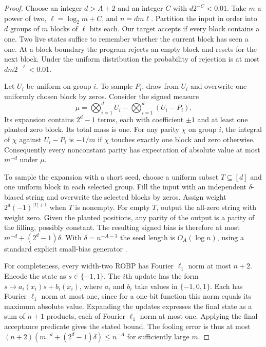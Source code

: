 \documentclass[11pt]{article}
\begin{document}
\begin{proof}
Choose an integer $d>A+2$ and an integer $C$ with $d2^{-C}<0.01$. Take $m$
a power of two, $\ell=\log_2 m+C$, and $n=dm\ell$. Partition the input
in order into $d$ groups of $m$ blocks of $\ell$ bits each. Our target
accepts if every block contains a one. Two live states suffice to remember
whether the current block has seen a one. At a block boundary the program
rejects an empty block and resets for the next block. Under the uniform
distribution the probability of rejection is at most $dm2^{-\ell}<0.01$.

Let $U_i$ be uniform on group $i$. To sample $P_i$, draw from $U_i$ and
overwrite one uniformly chosen block by zeros. Consider the signed measure
\[
  \mu=\bigotimes_{i=1}^d U_i-\bigotimes_{i=1}^d(U_i-P_i).
\]
Its expansion contains $2^d-1$ terms, each with coefficient $\pm1$ and
at least one planted zero block. Its total mass is one. For any parity
$\chi$ on group $i$, the integral of $\chi$ against $U_i-P_i$ is $-1/m$
if $\chi$ touches exactly one block and zero otherwise. Consequently every
nonconstant parity has expectation of absolute value at most $m^{-d}$
under $\mu$.

To sample the expansion with a short seed, choose a uniform subset
$T\subseteq[d]$ and one uniform block in each selected group. Fill the
input with an independent $\delta$-biased string and overwrite the selected
blocks by zeros. Assign weight $2^d(-1)^{|T|+1}$ when $T$ is nonempty.
For empty $T$, output the all-zero string with weight zero. Given the
planted positions, any parity of the output is a parity of the filling,
possibly constant. The resulting signed bias is therefore at most
$m^{-d}+(2^d-1)\delta$. With $\delta=n^{-A-3}$ the seed length is
$O_A(\log n)$, using a standard explicit small-bias generator \cite{AGHP}.

For completeness, every width-two ROBP has Fourier $\ell_1$ norm at most
$n+2$. Encode the state as $s\in\{-1,1\}$. The $i$th update has the form
$s\mapsto a_i(x_i)s+b_i(x_i)$, where $a_i$ and $b_i$ take values in
$\{-1,0,1\}$. Each has Fourier $\ell_1$ norm at most one, since for a
one-bit function this norm equals its maximum absolute value. Expanding
the updates expresses the final state as a sum of $n+1$ products, each of
Fourier $\ell_1$ norm at most one. Applying the final acceptance predicate
gives the stated bound. The fooling error is thus at most
$(n+2)(m^{-d}+(2^d-1)\delta)\le n^{-A}$ for sufficiently large $m$.
\end{proof}
\end{document}
